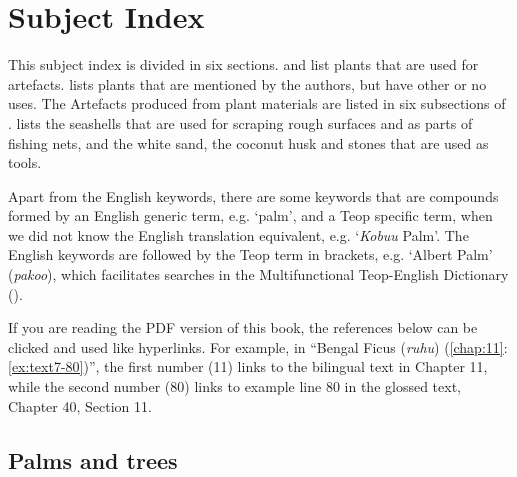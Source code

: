 \chapter*{Subject Index}

This subject index is divided in six sections.  and  list plants that are used for artefacts.  lists plants that are mentioned by the authors, but have other or no uses. The Artefacts produced from plant materials are listed in six subsections of .  lists the seashells that are used for scraping rough surfaces and as parts of fishing nets, and  the white sand, the coconut husk and stones that are used as tools.

Apart from the English keywords, there are some keywords that are compounds formed by an English generic term, e.g. `palm', and a Teop specific term, when we did not know the English translation equivalent, e.g. `\textit{Kobuu} Palm'. The English keywords are followed by the Teop term in brackets, e.g. `Albert Palm' (\textit{pakoo}), which facilitates searches in the Multifunctional Teop-English Dictionary (\cite{Mosel:2019bt}).

If you are reading the PDF version of this book, the references below can be clicked and used like hyperlinks. For example, in ``Bengal Ficus (\textit{ruhu}) (\ref{chap:11}:\ref{ex:text7-80})'', the first number (11) links to the bilingual text in Chapter 11, while the second number (80) links to example line 80 in the glossed text, Chapter 40, Section 11.

\section{Palms and trees}\label{ind:palmtrees}

